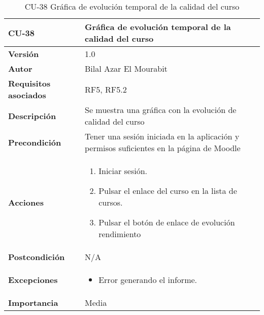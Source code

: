 \begin{table}[H]
	\centering
	\begin{tabularx}{\linewidth}{ p{} p{} }
		\toprule
		\textbf{CU-38}    & \textbf{Gráfica de evolución temporal de la calidad del curso}\\
		\toprule
		\textbf{Versión}              & 1.0    \\
		\textbf{Autor}                & Bilal Azar El Mourabit \\
		\textbf{Requisitos asociados} & RF5, RF5.2\\
		\textbf{Descripción}          & Se muestra una gráfica con la evolución de calidad del curso\\
    		\textbf{Precondición}         & Tener una sesión iniciada en la aplicación y permisos suficientes en la página de Moodle\\
		\textbf{Acciones}             & 
		\begin{enumerate}
			\def\labelenumi{\arabic{enumi}.}
			\tightlist
			\item Iniciar sesión.
            \item Pulsar el enlace del curso en la lista de cursos.
            \item Pulsar el botón de enlace de evolución rendimiento
		\end{enumerate}\\
		\textbf{Postcondición}        & N/A \\
		\textbf{Excepciones}          & \begin{itemize}
		    \item Error generando el informe.
		\end{itemize} \\
		\textbf{Importancia}          & Media \\
		\bottomrule
	\end{tabularx}
	\caption{CU-38 Gráfica de evolución temporal de la calidad del curso}
\end{table}

